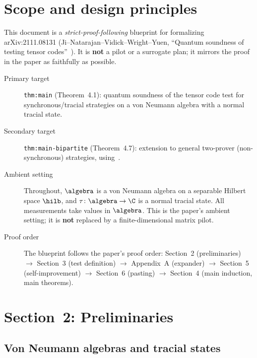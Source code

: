 
\chapter{Scope and design principles}
\label{chap:scope}

This document is a \emph{strict-proof-following} blueprint for formalizing
arXiv:2111.08131 (Ji--Natarajan--Vidick--Wright--Yuen, ``Quantum soundness of
testing tensor codes''~\cite{ji2024quantum}).
It is \textbf{not} a pilot or a surrogate plan;
it mirrors the proof in the paper as faithfully as possible.

\begin{description}
\item[Primary target]
  \texttt{thm:main} (Theorem~4.1): quantum soundness of the tensor code test
  for synchronous/tracial strategies on a von Neumann algebra with a normal
  tracial state.
\item[Secondary target]
  \texttt{thm:main-bipartite} (Theorem~4.7): extension to general two-prover
  (non-synchronous) strategies, using~\cite[Corollary~4.1]{vidick2021almost}.
\item[Ambient setting]
  Throughout, $\algebra$ is a von Neumann algebra on a separable Hilbert space
  $\hilb$, and $\tau\colon\algebra\to\C$ is a normal tracial state.
  All measurements take values in $\algebra$. This is the paper's ambient
  setting; it is \textbf{not} replaced by a finite-dimensional matrix pilot.
\item[Proof order]
  The blueprint follows the paper's proof order:
  Section~2 (preliminaries) $\to$ Section~3 (test definition) $\to$
  Appendix~A (expander) $\to$ Section~5 (self-improvement) $\to$
  Section~6 (pasting) $\to$ Section~4 (main induction, main theorems).
\end{description}


\chapter{Section~2: Preliminaries}
\label{chap:prelims}

\section{Von Neumann algebras and tracial states}

